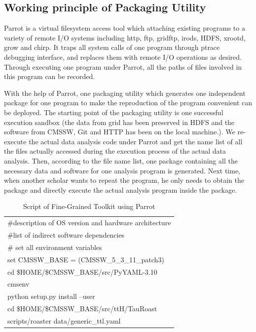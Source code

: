 \documentclass{acm_proc_article-sp}
\begin{document}
\subsection{Working principle of Packaging Utility} 

Parrot is a virtual filesystem access tool which attaching existing programs to
a variety of remote I/O systems including http, ftp, gridftp, irods, HDFS,
xrootd, grow and chirp. It traps all system calls of one program through ptrace
debugging interface, and replaces them with remote I/O operations as desired.
Through executing one program under Parrot, all the paths of files involved in
this program can be recorded.  

With the help of Parrot, one packaging utility which generates one independent
package for one program to make the reproduction of the program convenient can
be deployed. The starting point of the packaging utility is one successful execution
sandbox (the data from grid has been preserved in HDFS and the software from
CMSSW, Git and HTTP has been on the local machine.). We re-execute the actual
data analysis code under Parrot and get the name list of all the files actually
accessed during the execution process of the actual data analysis. Then,
according to the file name list, one package containing all the necessary data
and software for one analysis program is generated. Next time, when another
scholar wants to repeat the program, he only needs to obtain the package and
directly execute the actual analysis program inside the package.

\begin{table}
    \centering
    \begin{tabular}{|l|}
        \hline
        \#description of OS version and hardware architecture \\
        \#list of indirect software dependencies \\
        \# set all environment variables\\
        set CMSSW\_BASE = (CMSSW\_5\_3\_11\_patch3) \\
        cd \$HOME/\$CMSSW\_BASE/src/PyYAML-3.10\\
        cmsenv \\
        python setup.py install --user \\
        cd \$HOME/\$CMSSW\_BASE/src/ttH/TauRoast\\
        scripts/roaster data/generic\_ttl.yaml \\
        \hline
    \end{tabular}
    \caption{Script of Fine-Grained Toolkit using Parrot}
    \label{table:parrot-script}
\end{table}
\end{document}
